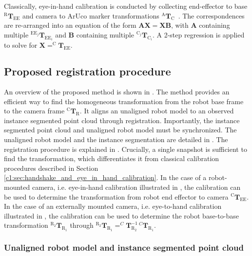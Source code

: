 Classically, eye-in-hand calibration is conducted by collecting end-effector to base $^\text{R}\mathbf{T}_\text{EE}$ and camera to ArUco marker transformations $^\text{A}\mathbf{T}_\text{C}$~\citep{eye_in_hand}. The correspondences are re-arranged into an equation of the form $\mathbf{A}\mathbf{X}=\mathbf{X}\mathbf{B}$, with $\mathbf{A}$ containing multiple $^{\text{EE}_j}\mathbf{T}_{\text{EE}_i}$ and $\mathbf{B}$ containing multiple $^{\text{C}_j}\mathbf{T}_{\text{C}_i}$. A 2-step regression is applied to solve for $\mathbf{X}=^\text{C}\mathbf{T}_\text{EE}$.

\subsection{Proposed registration procedure}
\label{c1:sec:proposed_calibration_procedure}
An overview of the proposed method is shown in . The method provides an efficient way to find the homogeneous transformation from the robot base frame to the camera frame $^\text{C}\mathbf{T}_\text{R}$. It aligns an unaligned robot model to an observed instance segmented point cloud through registration. Importantly, the instance segmented point cloud and unaligned robot model must be synchronized. The unaligned robot model and the instance segmentation are detailed in . The registration procedure is explained in . Crucially, a single snapshot is sufficient to find the transformation, which differentiates it from classical calibration procedures described in Section \ref{c1:sec:handshake_and_eye_in_hand_calibration}. In the case of a robot-mounted camera, i.e. eye-in-hand calibration illustrated in , the calibration can be used to determine the transformation from robot end effector to camera $^\text{C}\mathbf{T}_\text{EE}$. In the case of an externally mounted camera, i.e. eye-to-hand calibration illustrated in , the calibration can be used to determine the robot base-to-base transformation $^{\text{R}_2}\mathbf{T}_{\text{R}_1}$ through $^{\text{R}_2}\mathbf{T}_{\text{R}_1} = ^C\mathbf{T}^{-1}_{\text{R}_2}\,^{C}\mathbf{T}_{\text{R}_1}$.

\subsubsection{Unaligned robot model and instance segmented point cloud}
\label{c1:sec:unaligned_robot_model_and_instance_segmented_point_cloud}
